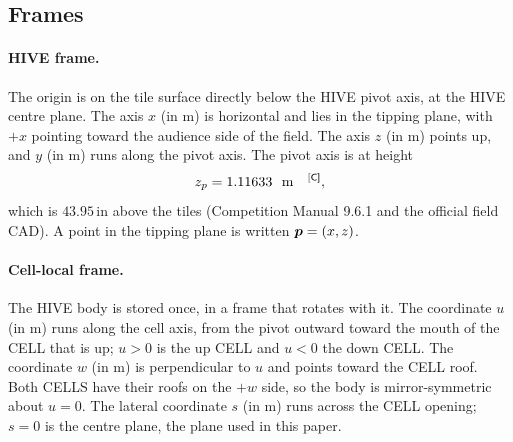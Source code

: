 \subsection{Frames}
\label{sec:geometry-frames}

\paragraph{HIVE frame.} The origin is on the tile surface directly below the HIVE pivot axis, at
the HIVE centre plane. The axis $x$ (in \unit{m}) is horizontal and lies in the tipping plane, with
$+x$ pointing toward the audience side of the field. The axis $z$ (in \unit{m}) points up, and $y$
(in \unit{m}) runs along the pivot axis. The pivot axis is at height
\begin{equation}
  z_p = 1.11633\ \text{\unit{m}}\text{\confirmed},
  \label{eq:geometry-pivot}
\end{equation}
which is $43.95$\,\unit{in}\confirmed{} above the tiles (Competition Manual 9.6.1 and the official
field CAD). A point in the tipping plane is written $\bm{p} = (x, z)$.

\paragraph{Cell-local frame.} The HIVE body is stored once, in a frame that rotates with it. The
coordinate $u$ (in \unit{m}) runs along the cell axis, from the pivot outward toward the mouth of
the CELL that is up; $u > 0$ is the up CELL and $u < 0$ the down CELL. The coordinate $w$ (in
\unit{m}) is perpendicular to $u$ and points toward the CELL roof. Both CELLS have their roofs on
the $+w$ side, so the body is mirror-symmetric about $u = 0$. The lateral coordinate $s$ (in
\unit{m}) runs across the CELL opening; $s = 0$ is the centre plane, the plane used in this paper.

